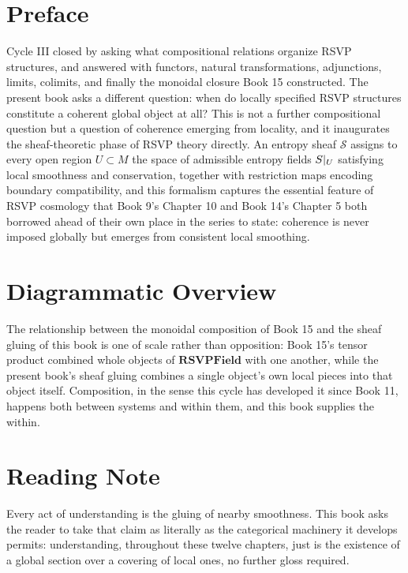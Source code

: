 \chapter*{Preface}

Cycle III closed by asking what compositional relations organize RSVP structures, and answered with functors, natural transformations, adjunctions, limits, colimits, and finally the monoidal closure Book 15 constructed. The present book asks a different question: when do locally specified RSVP structures constitute a coherent global object at all? This is not a further compositional question but a question of coherence emerging from locality, and it inaugurates the sheaf-theoretic phase of RSVP theory directly. An entropy sheaf $\mathcal{S}$ assigns to every open region $U \subset M$ the space of admissible entropy fields $S|_U$ satisfying local smoothness and conservation, together with restriction maps encoding boundary compatibility, and this formalism captures the essential feature of RSVP cosmology that Book 9's Chapter 10 and Book 14's Chapter 5 both borrowed ahead of their own place in the series to state: coherence is never imposed globally but emerges from consistent local smoothing.

\chapter*{Diagrammatic Overview}

The relationship between the monoidal composition of Book 15 and the sheaf gluing of this book is one of scale rather than opposition: Book 15's tensor product combined whole objects of $\mathbf{RSVPField}$ with one another, while the present book's sheaf gluing combines a single object's own local pieces into that object itself. Composition, in the sense this cycle has developed it since Book 11, happens both between systems and within them, and this book supplies the within.

\chapter*{Reading Note}

Every act of understanding is the gluing of nearby smoothness. This book asks the reader to take that claim as literally as the categorical machinery it develops permits: understanding, throughout these twelve chapters, just is the existence of a global section over a covering of local ones, no further gloss required.

